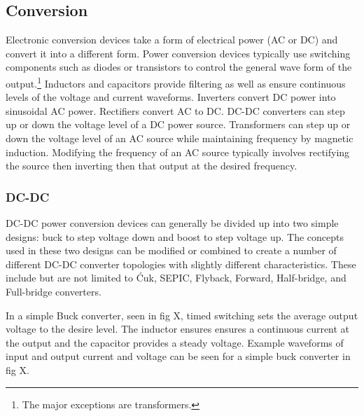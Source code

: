 
\subsection{Conversion}
Electronic conversion devices take a form of electrical power (AC or DC) and convert it into a different form. Power conversion devices typically use switching components such as diodes or transistors to control the general wave form of the output.\footnote{The major exceptions are transformers.} Inductors and capacitors provide filtering as well as ensure continuous levels of the voltage and current waveforms. Inverters convert DC power into sinusoidal AC power. Rectifiers convert AC to DC. DC-DC converters can step up or down the voltage level of a DC power source. Transformers can step up or down the voltage level of an AC source while maintaining frequency by magnetic induction. Modifying the frequency of an AC source typically involves rectifying the source then inverting then that output at the desired frequency. 

\subsubsection{DC-DC}
DC-DC power conversion devices can generally be divided up into two simple designs: buck to step voltage down and boost to step voltage up. The concepts used in these two designs can be modified or combined to create a number of different DC-DC converter topologies with slightly different characteristics. These include but are not limited to \'Cuk, SEPIC, Flyback, Forward, Half-bridge, and Full-bridge converters.

In a simple Buck converter, seen in fig X, timed switching sets the average output voltage to the desire level. The inductor ensures ensures a continuous current at the output and the capacitor provides a steady voltage. Example waveforms of input and output current and voltage can be seen for a simple buck converter in fig X.


